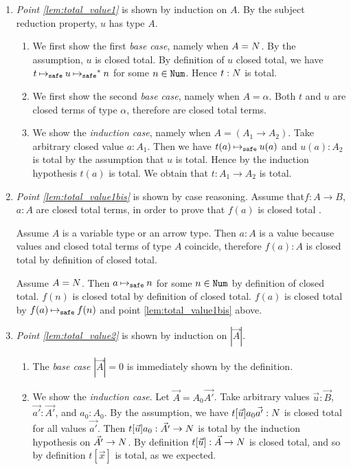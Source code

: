 \documentclass{article}
\newenvironment{proof}[1][Proof]{\begin{trivlist}
\item[\hskip \labelsep {\bfseries #1}]}{\end{trivlist}}
\begin{document}
\begin{proof}
\begin{enumerate}

\item
  \emph{Point \ref{lem:total_value1}} is shown by induction on $A$. 
By the subject reduction property, $u$ has type $A$.
\begin{enumerate}
\item
  We first show the first \emph{base case}, namely when $A ={N}$.
  By the assumption, $u$ is closed total.
  By definition of $u$ closed total, we have $t \mathbin{{\mapsto}_{\tiny \tt safe}} u \mathbin{{\mapsto}_{\tiny \tt safe}}^* n$ for some $n\in{\tt Num}$. 
  Hence $t:{N}$ is total.
\item
  We first show the second \emph{base case}, namely when $A =\alpha$.
  Both $t$ and $u$ are closed terms of type $\alpha$, therefore are closed total terms.
\item
  We show the \emph{induction case}, namely when $A = (A_1\rightarrow A_2)$.
  Take arbitrary closed value $a:A_1$. Then we have $t(a) \mathbin{{\mapsto}_{\tiny \tt safe}} u(a)$ and 
  $u(a):A_2$ is total by the assumption that $u$ is total.
  Hence by the induction hypothesis $t(a)$ is total. 
  We obtain that $t:A_1\rightarrow A_2$ is total. 
\end{enumerate}

  \item
\emph{Point \ref{lem:total_value1bis}} is shown by case reasoning.
Assume that$f:A \rightarrow B$, $a:A$ are closed total terms, in order to prove
that $f(a)$  is closed total .

Assume $A$ is a variable type or an arrow type. 
Then $a:A$ is a value because values and closed total terms of type $A$
coincide, therefore $f(a):A$ is closed total by definition of closed total.

Assume $A={N}$. Then $a \mathbin{{\mapsto}_{\tiny \tt safe}} n$ for some $n \in {\tt Num}$ by definition of closed total.
$f(n)$ is closed total by definition of closed total. $f(a)$ is closed total by $f(a) \mathbin{{\mapsto}_{\tiny \tt safe}} f(n)$
and point \ref{lem:total_value1bis} above.

\item  
  \emph{Point \ref{lem:total_value2}} is shown by induction on $|\vec{A}|$.
\begin{enumerate}
\item
  The \emph{base case} $|\vec{A}| = 0$ is immediately shown by the definition.
\item
  We show the \emph{induction case}. Let $\vec{A} = A_0\vec{A'}$.
  Take arbitrary values $\vec{u}:\vec{B}$, $\vec{a'}:\vec{A'}$, and $a_0:A_0$. 
  By the assumption, we have $t[\vec{u}]a_0\vec{a'}:{N}$ is closed total for all values $\vec{a'}$. 
  Then $t[\vec{u}]a_0:\vec{A'}\rightarrow{N}$ is total 
  by the induction hypothesis on $\vec{A'}\rightarrow {N}$.
  By definition $t[\vec{u}]:\vec{A}\rightarrow{N}$ is closed total,
  and so by definition $t[\vec{x}]$ is total, as we expected.
\end{enumerate}

\end{enumerate}
\end{proof}
\end{document}
